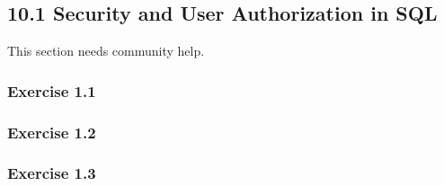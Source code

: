 \documentclass[../../main.tex]{subfiles}
\begin{document}
\subsection{10.1 Security and User Authorization in SQL}

This section needs community help.

\subsubsection*{Exercise 1.1}

\subsubsection*{Exercise 1.2}

\subsubsection*{Exercise 1.3}
\end{document}
